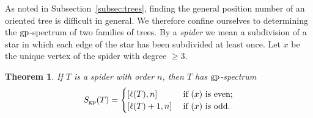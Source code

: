 \documentclass[a4paper,12pt]{article}
\newtheorem{theorem}{Theorem}[section]
\theoremstyle{definition}
\newcommand{\gp}{{\rm gp}}
\let\deg\relax
\DeclareMathOperator {\deg} {deg}
\begin{document}
	As noted in Subsection~\ref{subsec:trees}, finding the general position number of an oriented tree is difficult in general. We therefore confine ourselves to determining the $\gp $-spectrum of two families of trees. By a \emph{spider} we mean a subdivision of a star in which each edge of the star has been subdivided at least once. Let $x$ be the unique vertex of the spider with degree $\geq 3$.
	
	\begin{theorem}\label{thm:spider}
		If $T$ is a spider with order $n$, then $T$ has $\gp $-spectrum \[
		S_{\gp}(T) = \begin{cases}
			[\ell(T),n] & \text{ if }\deg(x)\text{ is even;}\\
			[\ell(T)+1,n] & \text{ if }\deg(x)\text{ is odd.}\\
		\end{cases}
		\]
	\end{theorem}
\end{document}
